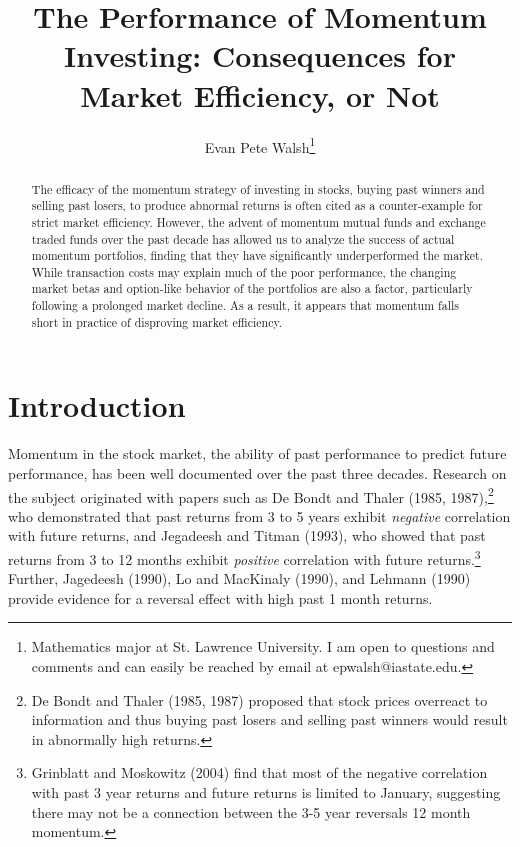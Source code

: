 \documentclass[12pt]{article}
\begin{document}
\author{Evan Pete Walsh\footnote{Mathematics major at St. Lawrence University. I am open to questions and comments and can easily be reached by email at epwalsh@iastate.edu.}}
\title{The Performance of Momentum Investing: Consequences for Market Efficiency, or Not}
\maketitle

\newpage
\begin{abstract}
The efficacy of the momentum strategy of investing in stocks, buying past winners and selling past losers, to produce abnormal returns is often cited as a counter-example for strict market efficiency. However, the advent of momentum mutual funds and exchange traded funds over the past decade has allowed us to analyze the success of actual momentum portfolios, finding that they have significantly underperformed the market. While transaction costs may explain much of the poor performance, the changing market betas and option-like behavior of the portfolios are also a factor, particularly following a prolonged market decline. As a result, it appears that momentum falls short in practice of disproving market efficiency.
\end{abstract}

\newpage

\tableofcontents
 
\newpage
\pagestyle{fancy}
\rhead{\thepage}
\rfoot{\today}
\cfoot{}%

\section{Introduction} %

Momentum in the stock market, the ability of past performance to predict future performance, has been well documented over the past three decades. Research on the subject originated with papers such as De Bondt and Thaler (1985, 1987),\footnote{De Bondt and Thaler (1985, 1987)  proposed that stock prices overreact to information and thus buying past losers and selling past winners would result in abnormally high returns.} who demonstrated that past returns from 3 to 5 years exhibit \emph{negative} correlation with future returns, and Jegadeesh and Titman (1993), who showed that past returns from 3 to 12 months exhibit \emph{positive} correlation with future returns.\footnote{Grinblatt and Moskowitz (2004) find that most of the negative correlation with past 3 year returns and future returns is limited to January, suggesting there may not be a connection between the 3-5 year reversals 12 month momentum.} Further, Jagedeesh (1990), Lo and MacKinaly (1990), and Lehmann (1990) provide evidence for a reversal effect with high past 1 month returns.
\end{document}

